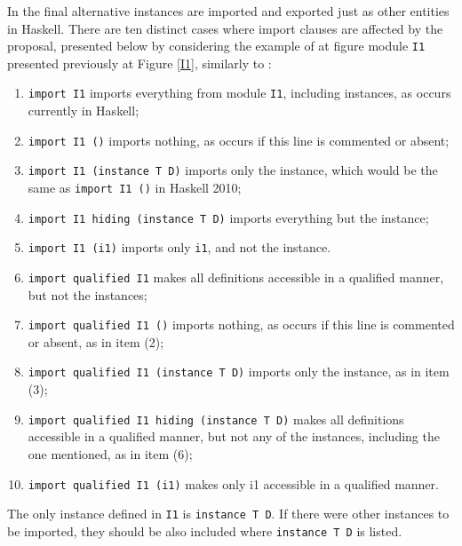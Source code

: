 \documentclass[msc]{ppgccufmg}
\begin{document}
In the final alternative instances are imported and exported just as other entities in Haskell.  There are ten distinct
cases where import clauses are affected by the proposal, presented below by
considering the example of at figure  module
\texttt{I1} presented previously at Figure \ref{I1}, similarly to
\cite[section~5.3.4]{report}:
\begin{enumerate}
\item \texttt{import I1} imports everything from module \texttt{I1},
  including instances, as occurs currently in Haskell;
\item \texttt{import I1 ()} imports nothing, as occurs if this line
  is commented or absent;
\item \texttt{import I1 (instance T D)} imports only the instance, which
  would be the same as \texttt{import I1 ()} in Haskell 2010;
\item \texttt{import I1 hiding (instance T D)} imports everything but
  the instance;
\item \texttt{import I1 (i1)} imports only \texttt{i1}, and not the
  instance.
\item \texttt{import qualified I1} makes all definitions accessible in a
  qualified manner, but not the instances;
\item \texttt{import qualified I1 ()} imports nothing, as occurs if this line is
  commented or absent, as in item (2);
\item \texttt{import qualified I1 (instance T D)} imports only the instance,
  as in item (3);
\item \texttt{import qualified I1 hiding (instance T D)} makes all definitions
  accessible in a qualified manner, but not any of the instances, including the
  one mentioned, as in item (6);
\item \texttt{import qualified I1 (i1)} makes only i1 accessible in a qualified
  manner.
\end{enumerate}

The only instance defined in \texttt{I1} is
\texttt{instance T D}.  If there were other instances to be imported, they should be also included
where \texttt{instance T D} is listed.
\end{document}
